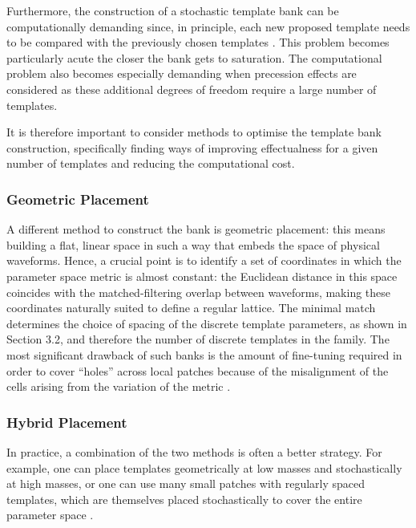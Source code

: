 \documentclass[binding=0.6cm, LaM]{sapthesis}
\begin{document}
	Furthermore, the construction of a stochastic template bank 
	can be computationally demanding since, in principle, 
	each new proposed template needs to be compared 
	with the previously chosen templates \cite{36}. 
	This problem becomes particularly acute 
	the closer the bank gets to saturation. 
	The computational problem also becomes especially demanding 
	when precession effects are considered as these additional degrees 
	of freedom require a large number of templates.

	It is therefore important to consider methods to optimise the template bank construction, 
	specifically finding ways of improving effectualness for a given number 
	of templates and reducing the computational cost. 

\subsubsection{Geometric Placement}
	A different method to construct the bank is geometric placement:
	this means building a flat, linear space in such a way that embeds the space of physical waveforms. 
	Hence, a crucial point is to identify a set of coordinates 
	in which the parameter space metric is almost constant: 
	the Euclidean distance in this space coincides with the matched-filtering overlap 
	between waveforms, making these coordinates naturally suited to define a regular lattice. 
	The minimal match determines the choice of spacing of the discrete template parameters, as shown in Section 3.2, 
	and therefore the number of discrete templates in the family.
	The most significant drawback of such banks is the amount of fine-tuning required 
	in order to cover ``holes'' across local patches because of the misalignment 
	of the cells arising from the variation of the metric \cite{29}. 

\subsubsection{Hybrid Placement}
\label{subsubsec:HybridBank}
	In practice, a combination of the two methods is often a better strategy. 
	For example, one can place templates geometrically at low masses 
	and stochastically at high masses, or one can use many small patches 
	with regularly spaced templates, which are themselves placed stochastically 
	to cover the entire parameter space \cite{29, 34}. 
\end{document}
